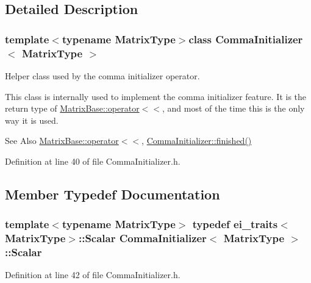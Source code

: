 \subsection{Detailed Description}
\subsubsection*{template$<$typename Matrix\-Type$>$class Comma\-Initializer$<$ Matrix\-Type $>$}

Helper class used by the comma initializer operator. 

This class is internally used to implement the comma initializer feature. It is the return type of \hyperlink{class_matrix_base_a6a6d785c96bfdfbd1d6947e0d3ab4cfd}{Matrix\-Base\-::operator$<$$<$}, and most of the time this is the only way it is used.

\begin{DoxySeeAlso}{See Also}
\hyperlink{class_matrix_base_MatrixBaseCommaInitRef}{Matrix\-Base\-:\-:operator$<$$<$}, \hyperlink{struct_comma_initializer_a259ebbcaa9e86e982e4685aa0aa1e03a}{Comma\-Initializer\-::finished()} 
\end{DoxySeeAlso}


Definition at line 40 of file Comma\-Initializer.\-h.



\subsection{Member Typedef Documentation}
\hypertarget{struct_comma_initializer_a9403fcf77305aeadb8c8d90132e94dc4}{
\subsubsection[{Scalar}]{\setlength{\rightskip}{0pt plus 5cm}template$<$typename Matrix\-Type$>$ typedef {\bf ei\-\_\-traits}$<$Matrix\-Type$>$\-::{\bf Scalar} {\bf Comma\-Initializer}$<$ Matrix\-Type $>$\-::{\bf Scalar}}}\label{struct_comma_initializer_a9403fcf77305aeadb8c8d90132e94dc4}


Definition at line 42 of file Comma\-Initializer.\-h.




